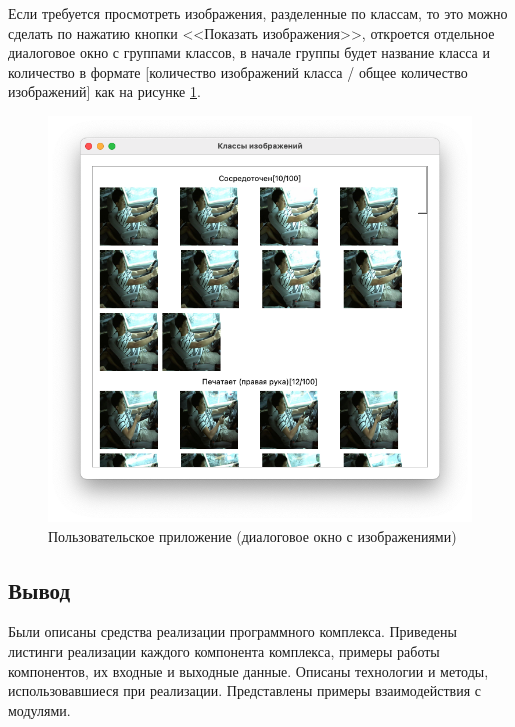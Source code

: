 Если требуется просмотреть изображения, разделенные по классам, то это можно сделать по нажатию кнопки <<Показать изображения>>, откроется отдельное диалоговое окно с группами классов, в начале группы будет название класса и количество в формате [количество изображений класса / общее количество изображений] как на рисунке \ref{fig:example_app_3}.

\begin{figure}[H]
	\centering
	\includegraphics[scale=0.55]{img/example_app_3.png}
	\caption{Пользовательское приложение (диалоговое окно с изображениями)}
	\label{fig:example_app_3}
\end{figure}

\subsection*{Вывод}
Были описаны средства реализации программного комплекса. Приведены листинги реализации каждого компонента комплекса, примеры работы компонентов, их входные и выходные данные. Описаны технологии и методы, использовавшиеся при реализации. Представлены примеры взаимодействия с модулями.

\pagebreak